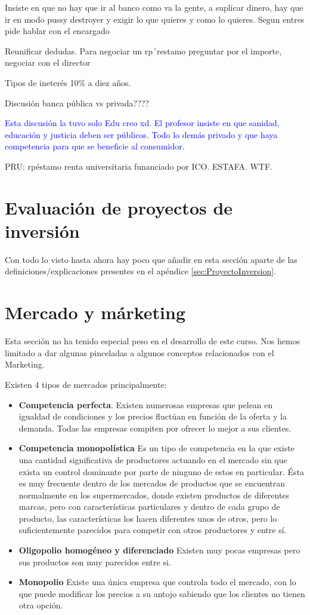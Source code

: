 \documentclass[nochap,palatino,shortheader]{apuntes}
\begin{document}
Insiste en que no hay que ir al banco como va la gente, a suplicar dinero, hay que ir en modo pussy destroyer y exigir lo que quieres y como lo quieres. Segun entres pide hablar con el encargado
\color{black}

Reunificar dedudas. Para negociar un rp´restamo preguntar por el importe, negociar con el director

Tipos de ineterés 10\% a diez años.

Discusión banca pública vs privada????

\textcolor{blue}{Esta discusión la tuvo solo Edu creo xd. El profesor insiste en que sanidad, educación y justicia deben ser públicos. Todo lo demás privado y que haya competencia para que se beneficie al consumidor.}

PRU: rpéstamo renta universitaria funanciado por ICO. ESTAFA. WTF.

\section{Evaluación de proyectos de inversión}
Con todo lo visto hasta ahora hay poco que añadir en esta sección aparte de las definiciones/explicaciones presentes en el apéndice \ref{sec:ProyectoInversion}.

\section{Mercado y márketing}

Esta sección no ha tenido especial peso en el desarrollo de este curso. Nos hemos limitado a dar algunas pinceladas a algunos conceptos relacionados con el Marketing.

Existen 4 tipos de mercados principalmente:
\begin{itemize}
\item \textbf{Competencia perfecta}. Existen numerosas empresas que pelean en igualdad de condiciones y los precios fluctúan en función de la oferta y la demanda. Todas las empresas compiten por ofrecer lo mejor a sus clientes.

\item \textbf{Competencia monopolística}
Es un tipo de competencia en la que existe una cantidad significativa de productores actuando en el mercado sin que exista un control dominante por parte de ninguno de estos en particular. Ésta es muy frecuente dentro de los mercados de productos que se encuentran normalmente en los supermercados, donde existen productos de diferentes marcas, pero con características particulares y dentro de cada grupo de producto, las características los hacen diferentes unos de otros, pero lo suficientemente parecidos para competir con otros productores y entre sí.
\item \textbf{Oligopolio homogéneo y diferenciado}
Existen muy pocas empresas pero sus productos son muy parecidos entre si.
\item \textbf{Monopolio}
Existe una única empresa que controla todo el mercado, con lo que puede modificar los precios a su antojo sabiendo que los clientes no tienen otra opción.
\end{itemize}
\end{document}
